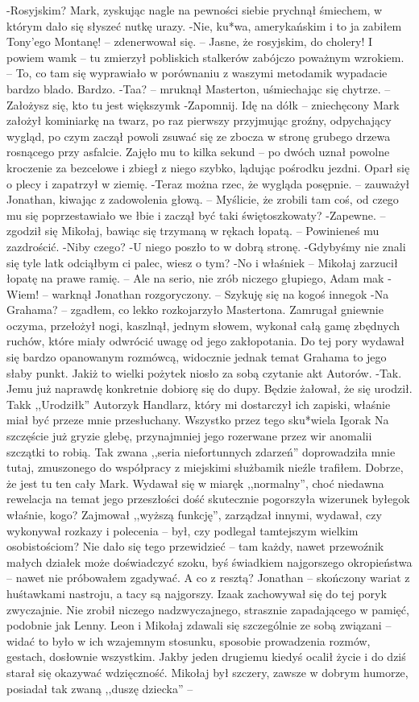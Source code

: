 \documentclass[../MAIN.tex]{subfiles}
\begin{document}
-Rosyjskim?
Mark, zyskując nagle na pewności siebie prychnął śmiechem, w którym dało się słyszeć nutkę urazy.
-Nie, ku*wa, amerykańskim i to ja zabiłem Tony’ego Montanę! -- zdenerwował się. -- Jasne, że rosyjskim, do cholery! I powiem wam\3k -- tu zmierzył pobliskich stalkerów zabójczo poważnym wzrokiem. -- To, co tam się wyprawiało w porównaniu z waszymi metodami\3k wypadacie bardzo blado. Bardzo.
-Taa? -- mruknął Masterton, uśmiechając się chytrze. -- Założysz się, kto tu jest większym\3k
-Zapomnij. Idę na dół\3k -- zniechęcony Mark założył kominiarkę na twarz, po raz pierwszy przyjmując groźny, odpychający wygląd, po czym zaczął powoli zsuwać się ze zbocza w stronę grubego drzewa rosnącego przy asfalcie. Zajęło mu to kilka sekund -- po dwóch uznał powolne kroczenie za bezcelowe i zbiegł z niego szybko, lądując pośrodku jezdni. Oparł się o plecy i zapatrzył w ziemię.
-Teraz można rzec, że wygląda posępnie. -- zauważył Jonathan, kiwając z zadowolenia głową. -- Myślicie, że zrobili tam coś, od czego mu się poprzestawiało we łbie i zaczął być taki świętoszkowaty?
-Zapewne. -- zgodził się Mikołaj, bawiąc się trzymaną w rękach łopatą. -- Powinieneś mu zazdrościć.
-Niby czego?
-U niego poszło to w dobrą stronę.
-Gdybyśmy nie znali się tyle lat\3k odciąłbym ci palec, wiesz o tym?
-No i właśnie\3k -- Mikołaj zarzucił łopatę na prawe ramię. -- Ale na serio, nie zrób niczego głupiego, Adam ma\3k
-Wiem! -- warknął Jonathan rozgoryczony. -- Szykuję się na kogoś innego\3k
-Na Grahama? -- zgadłem, co lekko rozkojarzyło Mastertona. Zamrugał gniewnie oczyma, przełożył nogi, kaszlnął, jednym słowem, wykonał całą gamę zbędnych ruchów, które miały odwrócić uwagę od jego zakłopotania. Do tej pory wydawał się bardzo opanowanym rozmówcą, widocznie jednak temat Grahama to jego słaby punkt.
Jakiż to wielki pożytek niosło za sobą czytanie akt Autorów.
-Tak. Jemu już naprawdę konkretnie dobiorę się do dupy. Będzie żałował, że się urodził.
Tak\3k
,,Urodził\3k''
Autorzy\3k
Handlarz, który mi dostarczył ich zapiski, właśnie miał być przeze mnie przesłuchany. Wszystko przez tego sku*wiela Igora\3k Na szczęście już gryzie glebę, przynajmniej jego rozerwane przez wir anomalii szczątki to robią. Tak zwana ,,seria niefortunnych zdarzeń'' doprowadziła mnie tutaj, zmuszonego do współpracy z miejskimi służbami\3k nieźle trafiłem.
Dobrze, że jest tu ten cały Mark.
Wydawał się w miarę\3k ,,normalny'', choć niedawna rewelacja na temat jego przeszłości dość skutecznie pogorszyła wizerunek byłego\3k właśnie, kogo? Zajmował ,,wyższą funkcję'', zarządzał innymi, wydawał, czy wykonywał rozkazy i polecenia -- był, czy podlegał tamtejszym wielkim osobistościom? Nie dało się tego przewidzieć -- tam każdy, nawet przewoźnik małych działek może doświadczyć szoku, byś świadkiem najgorszego okropieństwa -- nawet nie próbowałem zgadywać. A co z resztą? Jonathan -- skończony wariat z huśtawkami nastroju, a tacy są najgorszy. Izaak zachowywał się do tej pory\3k zwyczajnie. Nie zrobił niczego nadzwyczajnego, strasznie zapadającego w pamięć, podobnie jak Lenny. Leon i Mikołaj zdawali się szczególnie ze sobą związani -- widać to było w ich wzajemnym stosunku, sposobie prowadzenia rozmów, gestach, dosłownie wszystkim. Jakby jeden drugiemu kiedyś ocalił życie i do dziś starał się okazywać wdzięczność. Mikołaj był szczery, zawsze w dobrym humorze, posiadał tak zwaną ,,duszę dziecka'' -- 
\end{document}
